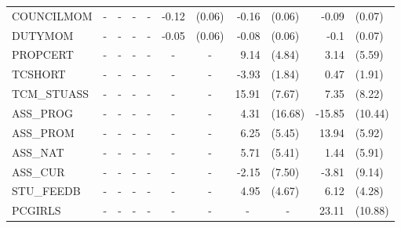 \documentclass[10pt]{article}
\begin{document}
\begin{table}[htbp]
\begin{tabular}{lrlrlrlrlrl}
     	COUNCILMOM & \multicolumn{1}{c}{-} & \multicolumn{1}{c}{-} & \multicolumn{1}{c}{-} & \multicolumn{1}{c}{-} & -0.12 & (0.06) & -0.16 & (0.06) & -0.09 & (0.07) \\[0.2em]
     	DUTYMOM & \multicolumn{1}{c}{-} & \multicolumn{1}{c}{-} & \multicolumn{1}{c}{-} & \multicolumn{1}{c}{-} & -0.05 & (0.06) & -0.08 & (0.06) & -0.1  & (0.07) \\[0.2em]
     	PROPCERT & \multicolumn{1}{c}{-} & \multicolumn{1}{c}{-} & \multicolumn{1}{c}{-} & \multicolumn{1}{c}{-} & \multicolumn{1}{c}{-} & \multicolumn{1}{c}{-} & 9.14  & (4.84) & 3.14  & (5.59) \\[0.2em]
     	TCSHORT & \multicolumn{1}{c}{-} & \multicolumn{1}{c}{-} & \multicolumn{1}{c}{-} & \multicolumn{1}{c}{-} & \multicolumn{1}{c}{-} & \multicolumn{1}{c}{-} & -3.93 & (1.84) & 0.47  & (1.91) \\[0.2em]
     	TCM\_STUASS & \multicolumn{1}{c}{-} & \multicolumn{1}{c}{-} & \multicolumn{1}{c}{-} & \multicolumn{1}{c}{-} & \multicolumn{1}{c}{-} & \multicolumn{1}{c}{-} & 15.91 & (7.67) & 7.35  & (8.22) \\[0.2em]
     	ASS\_PROG & \multicolumn{1}{c}{-} & \multicolumn{1}{c}{-} & \multicolumn{1}{c}{-} & \multicolumn{1}{c}{-} & \multicolumn{1}{c}{-} & \multicolumn{1}{c}{-} & 4.31  & (16.68) & -15.85 & (10.44) \\[0.2em]
     	ASS\_PROM & \multicolumn{1}{c}{-} & \multicolumn{1}{c}{-} & \multicolumn{1}{c}{-} & \multicolumn{1}{c}{-} & \multicolumn{1}{c}{-} & \multicolumn{1}{c}{-} & 6.25  & (5.45) & 13.94 & (5.92) \\[0.2em]
     	ASS\_NAT & \multicolumn{1}{c}{-} & \multicolumn{1}{c}{-} & \multicolumn{1}{c}{-} & \multicolumn{1}{c}{-} & \multicolumn{1}{c}{-} & \multicolumn{1}{c}{-} & 5.71  & (5.41) & 1.44  & (5.91) \\[0.2em]
     	ASS\_CUR & \multicolumn{1}{c}{-} & \multicolumn{1}{c}{-} & \multicolumn{1}{c}{-} & \multicolumn{1}{c}{-} & \multicolumn{1}{c}{-} & \multicolumn{1}{c}{-} & -2.15 & (7.50) & -3.81 & (9.14) \\[0.2em]
     	STU\_FEEDB & \multicolumn{1}{c}{-} & \multicolumn{1}{c}{-} & \multicolumn{1}{c}{-} & \multicolumn{1}{c}{-} & \multicolumn{1}{c}{-} & \multicolumn{1}{c}{-} & 4.95  & (4.67) & 6.12  & (4.28) \\[0.2em]
     	PCGIRLS & \multicolumn{1}{c}{-} & \multicolumn{1}{c}{-} & \multicolumn{1}{c}{-} & \multicolumn{1}{c}{-} & \multicolumn{1}{c}{-} & \multicolumn{1}{c}{-} & \multicolumn{1}{c}{-} & \multicolumn{1}{c}{-} & 23.11 & (10.88) \\[0.2em]

\end{tabular}
\end{table}
\end{document}
